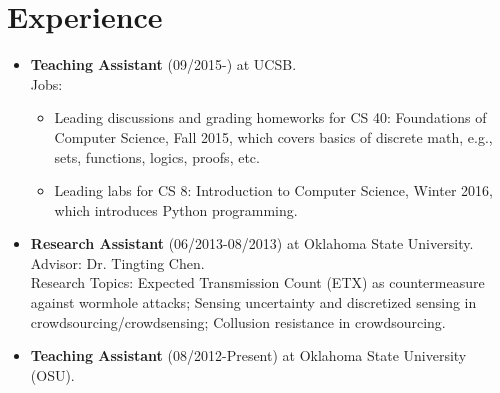 \documentclass{article}
\begin{document}
\section{{Experience}}
\begin{itemize}
\item {\bf Teaching Assistant} (09/2015-) at UCSB.\\
Jobs: 
	\begin{itemize}
	\item Leading discussions and grading homeworks for CS 40: Foundations of Computer Science, Fall 2015, which covers basics of discrete math, e.g., sets, functions, logics, proofs, etc.
	\item Leading labs for CS 8: Introduction to Computer Science, Winter 2016, which introduces Python programming.
	\end{itemize}
\item {\bf Research Assistant} (06/2013-08/2013) at Oklahoma State University.\\
Advisor: Dr. Tingting Chen.\\
Research Topics: Expected Transmission Count (ETX) as countermeasure against wormhole attacks; Sensing uncertainty and discretized sensing in crowdsourcing/crowdsensing; Collusion resistance in crowdsourcing.
%
%
\item {\bf Teaching Assistant} (08/2012-Present) at Oklahoma State University (OSU).


\end{itemize}
\end{document}
